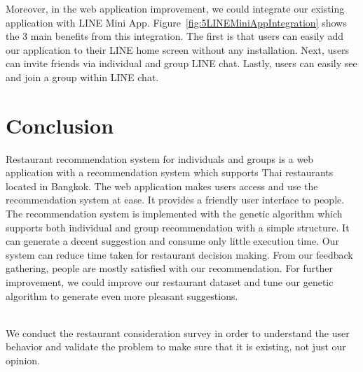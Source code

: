 \documentclass[12pt,oneside,openright,a4paper]{cpe-english-project}
\begin{document}
Moreover, in the web application improvement, we could integrate our existing application with LINE Mini App. Figure~\ref{fig:5LINEMiniAppIntegration} shows the 3 main benefits from this integration. The first is that users can easily add our application to their LINE home screen without any installation. Next, users can invite friends via individual and group LINE chat. Lastly, users can easily see and join a group within LINE chat.

\section{Conclusion}

Restaurant recommendation system for individuals and groups is a web application with a recommendation system which supports Thai restaurants located in Bangkok. The web application makes users access and use the recommendation system at ease. It provides a friendly user interface to people. The recommendation system is implemented with the genetic algorithm which supports both individual and group recommendation with a simple structure. It can generate a decent suggestion and consume only little execution time. Our system can reduce time taken for restaurant decision making. From our feedback gathering, people are mostly satisfied with our recommendation. For further improvement, we could improve our restaurant dataset and tune our genetic algorithm to generate even more pleasant suggestions.






\setcounter{figure}{0}
 \\

We conduct the restaurant consideration survey in order to understand the user behavior and validate the problem to make sure that it is existing, not just our opinion.
\end{document}
